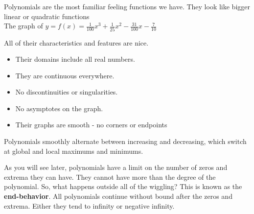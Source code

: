 \documentclass{ximera}
\begin{document}
Polynomials are the most familiar feeling functions we have. They look like bigger linear or quadratic functions\\

The graph of $y = f(x) = \frac{1}{100} x^3 + \frac{1}{25} x^2 - \frac{31}{100} x - \frac{7}{10}$

\begin{image}
\end{image}



All of their characteristics and features are nice.

\begin{itemize}
\item Their domains include all real numbers. 
\item They are continuous everywhere.
\item No discontinuities or singularities.
\item No asymptotes on the graph.
\item Their graphs are smooth - no corners or endpoints
\end{itemize}


Polynomials smoothly alternate between increasing and decreasing, which switch at global and local maximums and minimums.

As you will see later, polynomials have a limit on the number of zeros and extrema they can have.  They cannot have more than the degree of the polynomial. So, what happens outside all of the wiggling?  This is known as the \textbf{end-behavior}.  All polynomials continue without bound after the zeros and extrema.  Either they tend to infinity or negative infinity.
\end{document}

